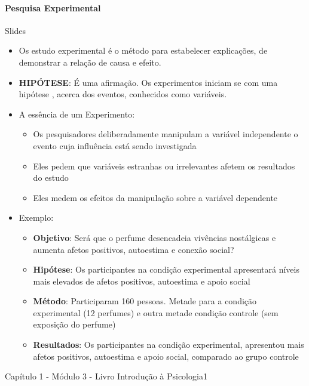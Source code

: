 \documentclass[
]{book}
\providecommand{\tightlist}{%
  \setlength{\itemsep}{0pt}\setlength{\parskip}{0pt}}
\begin{document}
\hypertarget{pesquisa-experimental}{%
\paragraph{Pesquisa Experimental}\label{pesquisa-experimental}}

Slides

\begin{itemize}
\tightlist
\item
  Os estudo experimental é o método para estabelecer explicações, de demonstrar a relação de causa e efeito.
\item
  \textbf{HIPÓTESE}: É uma afirmação. Os experimentos iniciam se com uma hipótese , acerca dos eventos, conhecidos como variáveis.
\item
  A essência de um Experimento:

  \begin{itemize}
  \tightlist
  \item
    Os pesquisadores deliberadamente manipulam a variável independente o evento cuja influência está sendo investigada
  \item
    Eles pedem que variáveis estranhas ou irrelevantes afetem os resultados do estudo
  \item
    Eles medem os efeitos da manipulação sobre a variável dependente
  \end{itemize}
\item
  Exemplo:

  \begin{itemize}
  \tightlist
  \item
    \textbf{Objetivo}: Será que o perfume desencadeia vivências nostálgicas e aumenta afetos positivos, autoestima e conexão social?
  \item
    \textbf{Hipótese}: Os participantes na condição experimental apresentará níveis mais elevados de afetos positivos, autoestima e apoio social
  \item
    \textbf{Método}: Participaram 160 pessoas. Metade para a condição experimental (12 perfumes) e outra metade condição controle (sem exposição do perfume)
  \item
    \textbf{Resultados}: Os participantes na condição experimental, apresentou mais
    afetos positivos, autoestima e apoio social, comparado ao grupo controle
  \end{itemize}
\end{itemize}

Capítulo 1 - Módulo 3 - Livro Introdução à Psicologia1
\end{document}
